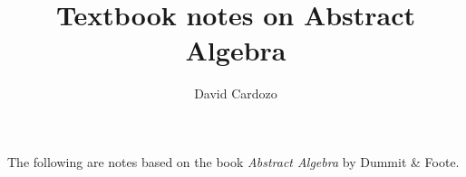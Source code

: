\documentclass[notitlepage]{article}
\author{David Cardozo}
\title{Textbook notes on Abstract Algebra}
\theoremstyle{definition}
\theoremstyle{remark}
\begin{document}
\maketitle
The following are notes based on the book \textit{Abstract Algebra} by Dummit \& Foote.






	
\end{document}
